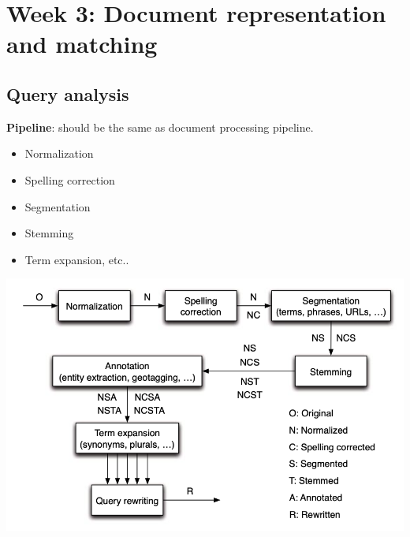 \section{Week 3: Document representation and matching}
\subsection{Query analysis}

\begin{minipage}{.5\textwidth}
\textbf{Pipeline}: should be the same as document processing pipeline.
\begin{itemize}
    \setlength\itemsep{0em}
    \item Normalization
    \item Spelling correction
    \item Segmentation
    \item Stemming
    \item Term expansion, etc..
\end{itemize}
\end{minipage}
\begin{minipage}{.45\textwidth}
\includegraphics[scale=0.5]{figures/query-analysis.png}
\end{minipage}

